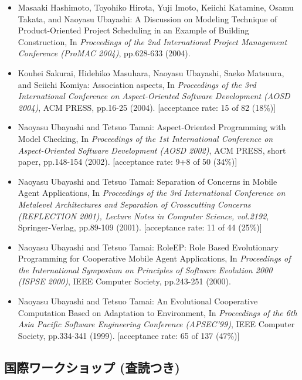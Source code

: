 \documentclass{jarticle}
\begin{document}
\begin{itemize}
\item Masaaki Hashimoto, Toyohiko Hirota, Yuji Imoto, Keiichi Katamine, Osamu Takata, and Naoyasu Ubayashi:
A Discussion on Modeling Technique of Product-Oriented Project Scheduling in an Example of Building Construction,
In {\em Proceedings of the 2nd International Project Management Conference (ProMAC 2004)},
pp.628-633 (2004).

\item Kouhei Sakurai, Hidehiko Masuhara, Naoyasu Ubayashi, Saeko Matsuura, and Seiichi Komiya:
Association aspects,
In {\em Proceedings of the 3rd International Conference on Aspect-Oriented Software Development (AOSD 2004)},
ACM PRESS,
pp.16-25 (2004).
[acceptance rate: 15 of 82 (18\%)]

\item Naoyasu Ubayashi and Tetsuo Tamai:
Aspect-Oriented Programming with Model Checking,
In {\em Proceedings of the 1st International Conference on Aspect-Oriented Software Development (AOSD 2002)},
ACM PRESS, short paper,
pp.148-154 (2002).
[acceptance rate: 9+8 of 50 (34\%)]

\item Naoyasu Ubayashi and Tetsuo Tamai:
Separation of Concerns in Mobile Agent Applications,
In {\em Proceedings of the 3rd International Conference on Metalevel Architectures and Separation of Crosscutting Concerns (REFLECTION 2001),
Lecture Notes in Computer Science, vol.2192}, Springer-Verlag,
pp.89-109 (2001).
[acceptance rate: 11 of 44 (25\%)]

\item Naoyasu Ubayashi and Tetsuo Tamai:
RoleEP: Role Based Evolutionary Programming for Cooperative Mobile Agent
Applications,
In {\em Proceedings of the International Symposium on Principles of Software Evolution 2000 (ISPSE 2000)},
IEEE Computer Society,
pp.243-251 (2000).

\item Naoyasu Ubayashi and Tetsuo Tamai:
An Evolutional Cooperative Computation
Based on Adaptation to Environment,
In {\em Proceedings of the 6th Asia Pacific Software Engineering Conference (APSEC'99)},
IEEE Computer Society,
pp.334-341 (1999).
[acceptance rate: 65 of 137 (47\%)]
\end{itemize}


\subsection{国際ワークショップ (査読つき)}
\end{document}
